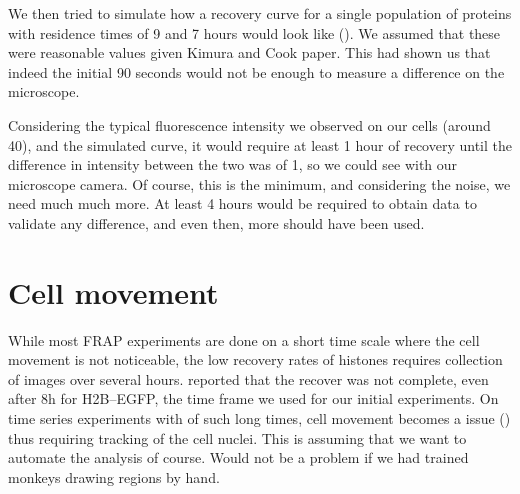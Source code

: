   \begin{figure}
    \centering
                 {}
    \label{fig:90-sec-frap}
  \end{figure}
  
  We then tried to simulate how a recovery curve for a single population of proteins with
  residence times of 9 and 7 hours would look like (). We assumed
  that these were reasonable values given Kimura and Cook paper. This had shown us that indeed
  the initial 90 seconds would not be enough to measure a difference on the microscope.
  
  \begin{figure}
    \centering
                 {}
    \label{fig:simulated-frap}
  \end{figure}
  
  Considering the typical fluorescence intensity we observed on our cells (around 40), and the simulated curve,
  it would require at least 1 hour of recovery until the difference in intensity between the two was of 1, so
  we could see with our microscope camera. Of course, this is the minimum, and considering the noise, we need
  much much more. At least 4 hours would be required to obtain data to validate any difference, and even then,
  more should have been used.


\section{Cell movement}

  While most FRAP experiments are done on a short time scale where the cell movement
  is not noticeable, the low recovery rates of histones requires collection of images
  over several hours.  reported that the recover was not
  complete, even after 8h for H2B--EGFP, the time frame we used for our initial experiments.
  On time series experiments with of such long
  times, cell movement becomes a issue () thus requiring tracking
  of the cell nuclei. This is assuming that we want to automate the analysis of course.
  Would not be a problem if we had trained monkeys drawing regions by hand.
  
